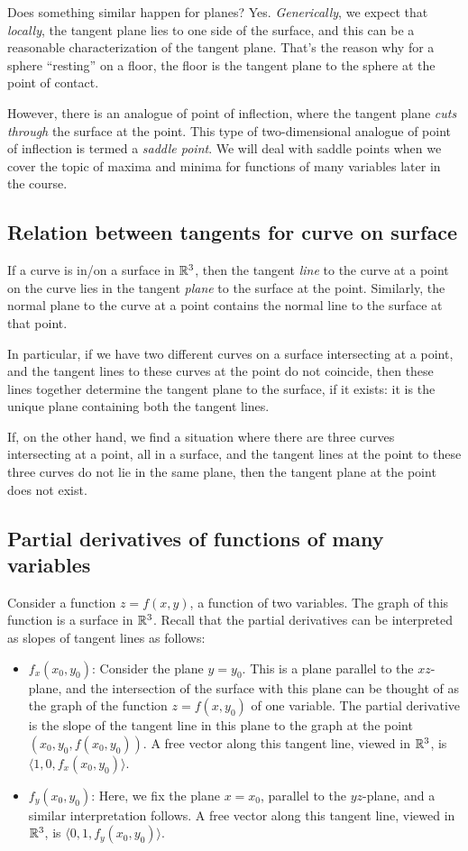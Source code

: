 \documentclass[10pt]{amsart}
\begin{document}
Does something similar happen for planes? Yes. {\em Generically}, we
expect that {\em locally}, the tangent plane lies to one side of the
surface, and this can be a reasonable characterization of the tangent
plane. That's the reason why for a sphere ``resting'' on a floor, the
floor is the tangent plane to the sphere at the point of contact.

However, there is an analogue of point of inflection, where the
tangent plane {\em cuts through} the surface at the point. This type
of two-dimensional analogue of point of inflection is termed a {\em
  saddle point}. We will deal with saddle points when we cover the
topic of maxima and minima for functions of many variables later in
the course.
\subsection{Relation between tangents for curve on surface}

If a curve is in/on a surface in $\mathbb{R}^3$, then the tangent {\em line}
to the curve at a point on the curve lies in the tangent {\em plane}
to the surface at the point. Similarly, the normal plane to the curve
at a point contains the normal line to the surface at that point.

In particular, if we have two different curves on a surface
intersecting at a point, and the tangent lines to these curves at the
point do not coincide, then these lines together determine the tangent
plane to the surface, if it exists: it is the unique plane containing
both the tangent lines.

If, on the other hand, we find a situation where there are three
curves intersecting at a point, all in a surface, and the tangent
lines at the point to these three curves do not lie in the same plane,
then the tangent plane at the point does not exist.

\subsection{Partial derivatives of functions of many variables}

Consider a function $z = f(x,y)$, a function of two variables. The
graph of this function is a surface in $\mathbb{R}^3$. Recall that the partial
derivatives can be interpreted as slopes of tangent lines as follows:

\begin{itemize}
\item $f_x(x_0,y_0)$: Consider the plane $y = y_0$. This is a plane
  parallel to the $xz$-plane, and the intersection of the surface with
  this plane can be thought of as the graph of the function $z =
  f(x,y_0)$ of one variable. The partial derivative is the slope of
  the tangent line in this plane to the graph at the point
  $(x_0,y_0,f(x_0,y_0))$. A free vector along this tangent line,
  viewed in $\mathbb{R}^3$, is $\langle 1,0,f_x(x_0,y_0) \rangle$.
\item $f_y(x_0,y_0)$: Here, we fix the plane $x = x_0$, parallel to
  the $yz$-plane, and a similar interpretation follows. A free vector
  along this tangent line, viewed in $\mathbb{R}^3$, is $\langle
  0,1,f_y(x_0,y_0)\rangle$.
\end{itemize}
\end{document}
